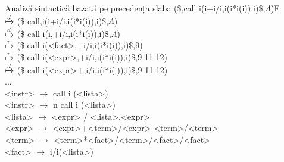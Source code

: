\documentclass[pdf]{beamer}
\begin{document}
\begin{frame}{Analiză sintactică bazată pe precedența slabă}
\scriptsize
\vspace{2 mm}
(\$,call i(i+i/i,i(i*i(i)),i)\$,$\Lambda$)F\\
$\xmapsto{d}$ (\$ call,i(i+i/i,i(i*i(i)),i)\$,$\Lambda$)\\
$\xmapsto{d}$ (\$ call i(i,+i/i,i(i*i(i)),i)\$,$\Lambda$)\\
$\xmapsto{r}$ (\$ call i(<fact>,+i/i,i(i*i(i)),i)\$,9)\\
$\xmapsto{r}$ (\$ call i(<expr>,+i/i,i(i*i(i)),i)\$,9 11 12)\\
$\xmapsto{d}$ (\$ call i(<expr>+,i/i,i(i*i(i)),i)\$,9 11 12)\\

...\\

<instr> $\rightarrow$ call i (<lista>)\\
<instr> $\rightarrow$ n call i (<lista>)\\
<lista> $\rightarrow$ <expr> / <lista>,<expr>\\
<expr>  $\rightarrow$ <expr>+<term>/<expr>-<term>/<term>\\
<term>  $\rightarrow$ <term>*<fact>/<term>/<fact>/<fact>\\
<fact>  $\rightarrow$ i/i(<lista>)\\

\end{frame}
\end{document}
